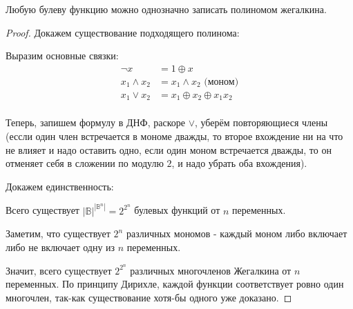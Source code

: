 \begin{theorem} \thmslashn

    Любую булеву функцию можно однозначно записать полиномом жегалкина.

    \begin{proof} \thmslashn
    
        Докажем существование подходящего полинома:

        Выразим основные связки:
        \begin{equation*}
            \begin{split} 
                \neg x &= 1 \oplus x\\
                x_1 \land x_2 &= x_1 \land x_2 \text{ (моном)}\\
                x_1 \lor x_2 &= x_1 \oplus x_2 \oplus x_1x_2\\
            \end{split}
        \end{equation*}

        Теперь, запишем формулу в ДНФ, раскоре $\lor$, уберём повторяющиеся члены (ессли один член встречается в мономе дважды, то второе вхождение ни на что не влияет и надо оставить одно, если один моном встречается дважды, то он отменяет себя в сложении по модулю $2$, и надо убрать оба вхождения).

        Докажем единственность:

        Всего существует $|\mathbb{B}|^{|\mathbb{B}^{n}|} = 2^{2^{n}}$ булевых функций от $n$ переменных.

        Заметим, что существует $2^{n}$ различных мономов - каждый моном либо включает либо не включает одну из $n$ переменных.

        Значит, всего существует $2^{2^{n}}$ различных многочленов Жегалкина от $n$ переменных. По принципу Дирихле, каждой функции соответствует ровно один многочлен, так-как существование хотя-бы одного уже доказано.


    \end{proof}
\end{theorem}


